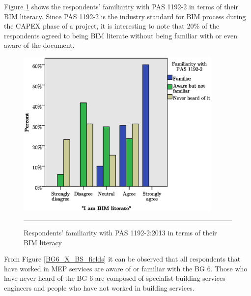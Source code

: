 Figure \ref{BIM_literacy_X_PAS1192} shows the respondents' familiarity with PAS 1192-2 in terms of their BIM literacy.
Since PAS 1192-2 is the industry standard for BIM process during the CAPEX phase of a project, it is interesting to note that 20\% of the respondents agreed to being BIM literate without being familiar with or even aware of the document.

\begin{figure}[htbp]
	\centering
	\includegraphics[width=0.9\textwidth]{figures/BimLiteracyXPas1192Percent.eps}
	\rule{0.9\textwidth}{0.5pt} %
	\caption{Respondents' familiarity with PAS 1192-2:2013 in terms of their BIM literacy}
	\label{BIM_literacy_X_PAS1192}
\end{figure}



From Figure \ref{BG6_X_BS_fields} it can be observed that all respondents that have worked in MEP services are aware of or familiar with the BG 6.
Those who have never heard of the BG 6 are composed of specialist building services engineers and people who have not worked in building services.

